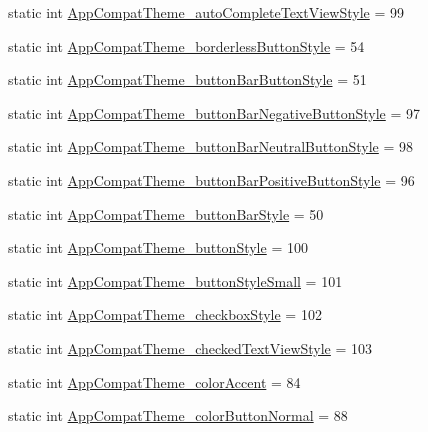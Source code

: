 \begin{DoxyCompactItemize}
\item 
static int \hyperlink{classandroid_1_1support_1_1design_1_1R_1_1styleable_ac4ebe90582d8572ba360303f2afe7100}{App\+Compat\+Theme\+\_\+auto\+Complete\+Text\+View\+Style} = 99
\item 
static int \hyperlink{classandroid_1_1support_1_1design_1_1R_1_1styleable_a51f25c97407bb9f72b8b17f1681d354c}{App\+Compat\+Theme\+\_\+borderless\+Button\+Style} = 54
\item 
static int \hyperlink{classandroid_1_1support_1_1design_1_1R_1_1styleable_af8735dbd6db5ad3231c6574488067693}{App\+Compat\+Theme\+\_\+button\+Bar\+Button\+Style} = 51
\item 
static int \hyperlink{classandroid_1_1support_1_1design_1_1R_1_1styleable_aeede02e7ba2a6ab7672998a15ad32367}{App\+Compat\+Theme\+\_\+button\+Bar\+Negative\+Button\+Style} = 97
\item 
static int \hyperlink{classandroid_1_1support_1_1design_1_1R_1_1styleable_a4599da08b2e1afe7ea7a57322f4c6e3a}{App\+Compat\+Theme\+\_\+button\+Bar\+Neutral\+Button\+Style} = 98
\item 
static int \hyperlink{classandroid_1_1support_1_1design_1_1R_1_1styleable_ad6dccbdc26acca166bca4b6b693c30aa}{App\+Compat\+Theme\+\_\+button\+Bar\+Positive\+Button\+Style} = 96
\item 
static int \hyperlink{classandroid_1_1support_1_1design_1_1R_1_1styleable_a434b825974ffc445f7d2c1c0ebca20c2}{App\+Compat\+Theme\+\_\+button\+Bar\+Style} = 50
\item 
static int \hyperlink{classandroid_1_1support_1_1design_1_1R_1_1styleable_ae0dbe579dfa57a5cbc98e488b1a7d61b}{App\+Compat\+Theme\+\_\+button\+Style} = 100
\item 
static int \hyperlink{classandroid_1_1support_1_1design_1_1R_1_1styleable_ab5e406e1fb26b0441b85e2dc760d1898}{App\+Compat\+Theme\+\_\+button\+Style\+Small} = 101
\item 
static int \hyperlink{classandroid_1_1support_1_1design_1_1R_1_1styleable_a02bb9011b2cb08a21cec78bbaccf85f0}{App\+Compat\+Theme\+\_\+checkbox\+Style} = 102
\item 
static int \hyperlink{classandroid_1_1support_1_1design_1_1R_1_1styleable_a2c04271b29c4402ba6651dc55d3c3730}{App\+Compat\+Theme\+\_\+checked\+Text\+View\+Style} = 103
\item 
static int \hyperlink{classandroid_1_1support_1_1design_1_1R_1_1styleable_ade0801de138ef167ffaf75a110ce48b0}{App\+Compat\+Theme\+\_\+color\+Accent} = 84
\item 
static int \hyperlink{classandroid_1_1support_1_1design_1_1R_1_1styleable_ab55fa86e1ca1799c130f3c2f5b8ef8a1}{App\+Compat\+Theme\+\_\+color\+Button\+Normal} = 88

\end{DoxyCompactItemize}
